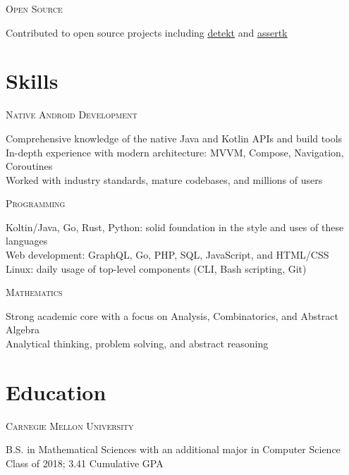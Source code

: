 \documentclass[letterpaper,10pt]{article}
\newcommand{\lb}{\vspace{4pt} \\}
\newenvironment{resumecols1}[1]
{
    \begin{minipage}[t]{.21\linewidth}
        \begin{flushright}
            \textsc{#1}
        \end{flushright}
    \end{minipage}
    \hspace{.004\linewidth}
    \begin{minipage}[t]{.775\linewidth}
}
{
    \end{minipage}
}
\begin{document}
\begin{resumecols1}{Open Source}
    Contributed to open source projects including \href{https://github.com/detekt/detekt/issues?q=author\%3Adzirbel}{\underline{detekt}} and \href{https://github.com/willowtreeapps/assertk/issues?q=author\%3Adzirbel}{\underline{assertk}}
\end{resumecols1}

\section{Skills}

\begin{resumecols1}{Native Android Development}
    Comprehensive knowledge of the native Java and Kotlin APIs and build tools \\
    In-depth experience with modern architecture: MVVM, Compose, Navigation, Coroutines \\
    Worked with industry standards, mature codebases, and millions of users
\end{resumecols1}

\vspace{6pt}

\begin{resumecols1}{Programming}
    Koltin/Java, Go, Rust, Python: solid foundation in the style and uses of these languages \\
    Web development: GraphQL, Go, PHP, SQL, JavaScript, and HTML/CSS \\
    Linux: daily usage of top-level components (CLI, Bash scripting, Git)
\end{resumecols1}

\vspace{6pt}

\begin{resumecols1}{Mathematics}
    Strong academic core with a focus on Analysis, Combinatorics, and Abstract Algebra \\
    Analytical thinking, problem solving, and abstract reasoning
\end{resumecols1}

\section{Education}

\begin{resumecols1}{Carnegie Mellon University}
    B.S. in Mathematical Sciences with an additional major in Computer Science
    \lb
    Class of 2018; 3.41 Cumulative GPA
\end{resumecols1}
\end{document}
